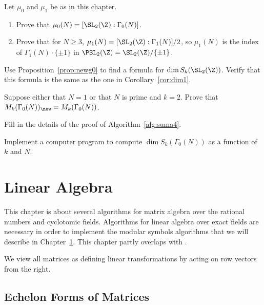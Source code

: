  \begin{exercises}
\item\label{ex:mu0n} 
Let $\mu_0$ and $\mu_1$ be as in this chapter. 
\begin{enumerate}
\item Prove that $\mu_0(N) = [\SL_2(\Z):\Gamma_0(N)]$.
\item Prove that for $N\geq 3$, $\mu_1(N) = [\SL_2(\Z):\Gamma_1(N)]/2$,
so $\mu_1(N)$ is the index of $\Gamma_1(N) \cdot \{\pm 1\}$
in $\PSL_2(\Z) = \SL_2(\Z)/\{\pm 1\}$.
\end{enumerate}

\item \label{ex:formsl2z}
Use Proposition~\ref{prop:newg0} to find a formula
for $\dim S_k(\SL_2(\Z))$.  Verify that this formula is
the same as the one in Corollary~\ref{cor:dim1}.

\item \label{ex:newmatch}
Suppose either that $N=1$ or that $N$ is prime and $k=2$.
Prove that $M_k(\Gamma_0(N))_{\new} = M_k(\Gamma_0(N))$.

\item \label{ex:suma4} Fill in the details of the 
proof of Algorithm~\ref{alg:suma4}.

\item \label{ex:sagedim} Implement a computer program
to compute $\dim S_k(\Gamma_0(N))$ as a function of $k$ and $N$.


\end{exercises}











\chapter{Linear Algebra}\label{ch:linalg}
This chapter is about several algorithms for matrix algebra over the
rational numbers and cyclotomic fields.  Algorithms for linear algebra
over exact fields are necessary in order to implement the modular
symbols algorithms that we will describe in Chapter~\ref{ch:linalg}.
This chapter partly overlaps with \cite[Sections 2.1--2.4]{cohen:course_ant}.

\vspace{2ex}
 We view all matrices as defining
linear transformations by acting on row vectors from the right.

\section{Echelon Forms of Matrices}\label{sec:echelon_form}

